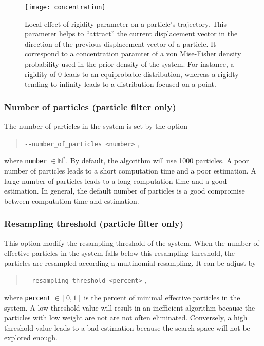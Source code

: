         \begin{figure}
            \centering
            \texttt{[image: concentration]}
            \caption{Local effect of rigidity parameter on a particle's
trajectory. This parameter helps to ``attract'' the current
displacement vector in the direction of the previous displacement vector of a
particle. It correspond to a concentration paramter of a von Mise-Fisher density
probability used in the prior density of the system. For instance, a rigidity of
0 leads to an equiprobable distribution, whereas a rigidty tending to infinity
leads to a distribution focused on a point.}
            \label{tracto-fig:concentration}
        \end{figure}


    \subsubsection*{Number of particles (particle filter only)}
        The number of particles in the system is set by the option
            \begin{quote}
                \texttt{-\hspace{0.1mm}-number\_of\_particles <number>} \enspace ,
            \end{quote}
        where \texttt{number}$\;\in\mathbb{N}^*$. By default, the algorithm will
        use 1000 particles. A poor number of particles leads to a short
computation time and a poor estimation. A large number of particles leads to a
long computation time and a good estimation. In general, the default number of
particles is a good compromise between computation time and estimation.


    \subsubsection*{Resampling threshold (particle filter only)}
        This option modify the resampling threshold of the system. When the
number of effective particles in the system falls below this resampling
threshold, the particles are resampled according a multinomial resampling. It
can be adjust by
            \begin{quote}
                \texttt{-\hspace{0.1mm}-resampling\_threshold <percent>} \enspace ,
            \end{quote}
        where \texttt{percent}$\;\in[0,1]$ is the percent of minimal effective 
        particles in the system. A low threshold value will result in an
inefficient algorithm because the particles with low weight are not are not
often eliminated. Conversely, a high threshold value leads to a bad estimation
because the search space will not be explored enough.


